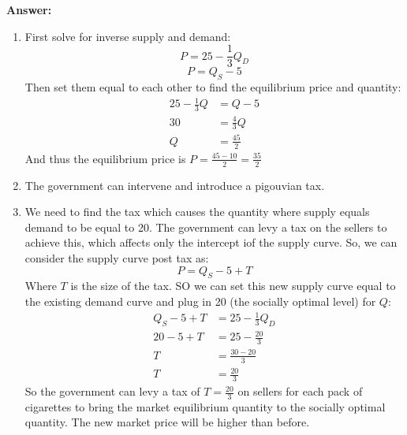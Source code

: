 \documentclass[12pt]{article}
\begin{document}
\textbf{Answer:}
\begin{enumerate}[label = (\alph*)]
    \item First solve for inverse supply and demand:
    \[P = 25 - \frac{1}{3}Q_D\]
    \[P = Q_S - 5\]
    Then set them equal to each other to find the equilibrium price and quantity:
    \begin{align*}
        25 - \frac{1}{3}Q &= Q - 5 \\
        30 &= \frac{4}{3}Q \\
        Q &= \frac{45}{2}
    \end{align*}
    And thus the equilibrium price is $P = \frac{45 - 10}{2} = \frac{35}{2}$
    \item The government can intervene and introduce a pigouvian tax.
    \item We need to find the tax which causes the quantity where supply equals demand to be equal to 20. The government can levy a tax on the sellers to achieve this, which affects only the intercept iof the supply curve. So, we can consider the supply curve post tax as:
    \[P = Q_S -5 + T\]
    Where $T$ is the size of the tax. SO we can set this new supply curve equal to the existing demand curve and plug in 20 (the socially optimal level) for $Q$:
    \begin{align*}
        Q_S -5 + T &= 25 - \frac{1}{3}Q_D \\
        20 - 5 + T &= 25 - \frac{20}{3} \\
        T &= \frac{30 - 20}{3} \\
        T &= \frac{20}{3}
    \end{align*}
    So the government can levy a tax of $T = \frac{20}{3}$ on sellers for each pack of cigarettes to bring the market equilibrium quantity to the socially optimal quantity. The new market price will be higher than before.

\end{enumerate}
\end{document}
